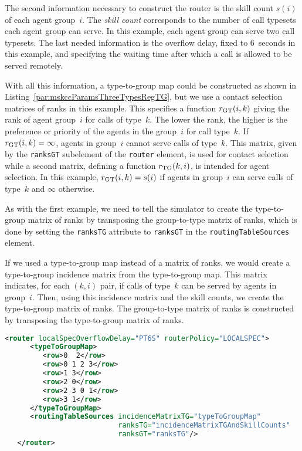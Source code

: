 The second information necessary to construct the router is the
skill count $s(i)$
of each agent group~$i$.  The \emph{skill count} corresponds
to the number of call typesets each agent group can serve.  In this
example, each agent group can serve two call typesets.
The last needed information is the overflow delay,
fixed to 6~seconds in this example,
and specifying the waiting time after which a call is allowed to be
served remotely.

With all this
information, a type-to-group map could be
constructed as shown in Listing~\ref{par:mskccParamsThreeTypesRegTG},
but we use a contact selection
matrices of ranks in this example.
This specifies a function $\rGT(i, k)$ giving the rank of agent group~$i$
for calls of type~$k$.  The lower the rank, the higher is the
preference or priority of the agents in the group~$i$ for call
type~$k$.
If $\rGT(i,k)=\infty$, agents in group~$i$ cannot serve calls of type~$k$.
This matrix, given by the \texttt{ranksGT} subelement of the
\texttt{router} element,
is used for contact selection while a second matrix,
defining a function $\rTG(k, i)$, is intended for agent selection.
In this example, $\rGT(i, k)=s(i)$ if agents in group~$i$ can serve
calls of type~$k$ and $\infty$ otherwise.

As with the first example, we need to tell the simulator to create the
type-to-group matrix of ranks by transposing the group-to-type
matrix of ranks, which is done by setting the \texttt{ranksTG} attribute to
\texttt{ranksGT} in the \texttt{routing\-Table\-Sources} element.

If we used a type-to-group map instead of a matrix of ranks,
we would create a type-to-group incidence matrix from the
type-to-group map.  This matrix indicates, for each $(k, i)$ pair, if
calls of type~$k$ can be served by agents in group~$i$.  Then, using
this incidence matrix and the skill counts, we create the
type-to-group matrix of ranks.
The group-to-type matrix of ranks is constructed by transposing the
type-to-group matrix of ranks.

\begin{lstlisting}[caption={Parameters for the local-specialist
    routing policy with type-to-group map equivalent to
    example in Listing~\ref{par:mskccParamsThreeTypesReg}},
  language=XML,
  label=par:mskccParamsThreeTypesRegTG]
   <router localSpecOverflowDelay="PT6S" routerPolicy="LOCALSPEC">
      <typeToGroupMap>
         <row>0  2</row>
         <row>0 1 2 3</row>
         <row>1 3</row>
         <row>2 0</row>
         <row>2 3 0 1</row>
         <row>3 1</row>
      </typeToGroupMap>
      <routingTableSources incidenceMatrixTG="typeToGroupMap"
                           ranksTG="incidenceMatrixTGAndSkillCounts"
                           ranksGT="ranksTG"/>
   </router>
\end{lstlisting}

